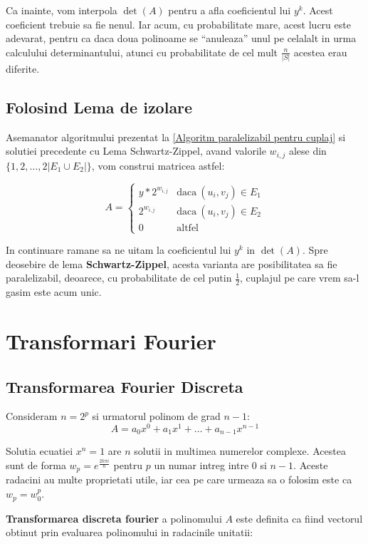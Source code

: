 Ca inainte, vom interpola $\det(A)$ pentru a afla coeficientul lui $y^{k}$.
Acest coeficient trebuie sa fie nenul. Iar acum, cu probabilitate mare, acest
lucru este adevarat, pentru ca daca doua polinoame se ``anuleaza'' unul pe
celalalt in urma calculului determinantului, atunci cu probabilitate de cel mult
$\frac{n}{|S|}$ acestea erau diferite.

\subsection{Folosind Lema de izolare}
Asemanator algoritmului prezentat la \ref{Algoritm paralelizabil pentru cuplaj}
si solutiei precedente cu Lema Schwartz-Zippel, avand valorile $w_{i,j}$ alese
din $\{1, 2, \ldots, 2|E_{1} \cup E_{2}|\}$, vom construi matricea astfel:

\begin{equation}
  A=
  \begin{cases}
    y * 2^{w_{i,j}} & \text{daca}\ (u_{i}, v_{j}) \in E_{1} \\
    2^{w_{i,j}} & \text{daca}\ (u_{i}, v_{j}) \in E_{2} \\
    0 & \text{altfel}
  \end{cases}
\end{equation}

In continuare ramane sa ne uitam la coeficientul lui $y^{k}$ in $\det(A)$. Spre
deosebire de lema \textbf{Schwartz-Zippel}, acesta varianta are posibilitatea sa fie
paralelizabil, deoarece, cu probabilitate de cel putin $\frac{1}{2}$, cuplajul
pe care vrem sa-l gasim este acum unic.

\pagebreak

\section{Transformari Fourier}

\subsection{Transformarea Fourier Discreta}
Consideram $n = 2^{p}$ si urmatorul polinom de grad $n-1$:
\begin{equation}
  A = a_{0}x^{0} + a_{1}x^{1} + \ldots + a_{n-1}x^{n-1}
\end{equation}

Solutia ecuatiei $x^{n} = 1$ are $n$ solutii in multimea numerelor complexe.
Acestea sunt de forma $w_{p} = e^{\frac{2k\pi i}{n}}$ pentru $p$ un numar intreg
intre $0$ si $n-1$. Aceste radacini au multe proprietati utile, iar cea pe care
urmeaza sa o folosim este ca $w_{p} = w_{0}^{p}$. \par
\textbf{Transformarea discreta fourier} a polinomului $A$ este definita ca fiind
vectorul obtinut prin evaluarea polinomului in radacinile unitatii:

